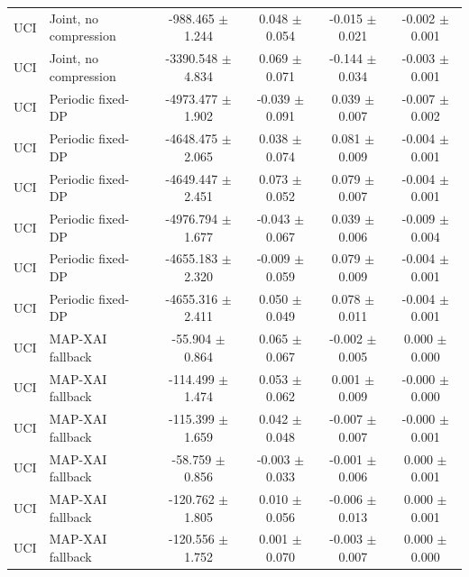\begin{tabular}{llcccc}
UCI & Joint, no compression & -988.465 $\pm$ 1.244 & 0.048 $\pm$ 0.054 & -0.015 $\pm$ 0.021 & -0.002 $\pm$ 0.001 \\
UCI & Joint, no compression & -3390.548 $\pm$ 4.834 & 0.069 $\pm$ 0.071 & -0.144 $\pm$ 0.034 & -0.003 $\pm$ 0.001 \\
UCI & Periodic fixed-DP & -4973.477 $\pm$ 1.902 & -0.039 $\pm$ 0.091 & 0.039 $\pm$ 0.007 & -0.007 $\pm$ 0.002 \\
UCI & Periodic fixed-DP & -4648.475 $\pm$ 2.065 & 0.038 $\pm$ 0.074 & 0.081 $\pm$ 0.009 & -0.004 $\pm$ 0.001 \\
UCI & Periodic fixed-DP & -4649.447 $\pm$ 2.451 & 0.073 $\pm$ 0.052 & 0.079 $\pm$ 0.007 & -0.004 $\pm$ 0.001 \\
UCI & Periodic fixed-DP & -4976.794 $\pm$ 1.677 & -0.043 $\pm$ 0.067 & 0.039 $\pm$ 0.006 & -0.009 $\pm$ 0.004 \\
UCI & Periodic fixed-DP & -4655.183 $\pm$ 2.320 & -0.009 $\pm$ 0.059 & 0.079 $\pm$ 0.009 & -0.004 $\pm$ 0.001 \\
UCI & Periodic fixed-DP & -4655.316 $\pm$ 2.411 & 0.050 $\pm$ 0.049 & 0.078 $\pm$ 0.011 & -0.004 $\pm$ 0.001 \\
UCI & MAP-XAI fallback & -55.904 $\pm$ 0.864 & 0.065 $\pm$ 0.067 & -0.002 $\pm$ 0.005 & 0.000 $\pm$ 0.000 \\
UCI & MAP-XAI fallback & -114.499 $\pm$ 1.474 & 0.053 $\pm$ 0.062 & 0.001 $\pm$ 0.009 & -0.000 $\pm$ 0.000 \\
UCI & MAP-XAI fallback & -115.399 $\pm$ 1.659 & 0.042 $\pm$ 0.048 & -0.007 $\pm$ 0.007 & -0.000 $\pm$ 0.001 \\
UCI & MAP-XAI fallback & -58.759 $\pm$ 0.856 & -0.003 $\pm$ 0.033 & -0.001 $\pm$ 0.006 & 0.000 $\pm$ 0.001 \\
UCI & MAP-XAI fallback & -120.762 $\pm$ 1.805 & 0.010 $\pm$ 0.056 & -0.006 $\pm$ 0.013 & 0.000 $\pm$ 0.001 \\
UCI & MAP-XAI fallback & -120.556 $\pm$ 1.752 & 0.001 $\pm$ 0.070 & -0.003 $\pm$ 0.007 & 0.000 $\pm$ 0.000 \\
\bottomrule
\end{tabular}
